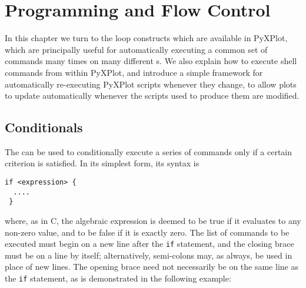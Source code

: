 %
%
%
%
%



\chapter{Programming and Flow Control}

In this chapter we turn to the loop constructs which are available in PyXPlot,
which are principally useful for automatically executing a common set of
commands many times on many different \datafile s. We also explain how to
execute shell commands from within PyXPlot, and introduce a simple framework
for automatically re-executing PyXPlot scripts whenever they change, to allow
plots to update automatically whenever the scripts used to produce them are
modified.

\section{Conditionals}

The  can be used to conditionally execute a series of commands only
if a certain criterion is satisfied. In its simplest form, its syntax is

\begin{verbatim}
if <expression> {
  ....
 }
\end{verbatim}

\noindent where, as in C, the algebraic expression is deemed to be true if it
evaluates to any non-zero value, and to be false if it is exactly zero. The
list of commands to be executed must begin on a new line after the {\tt if}
statement, and the closing brace must be on a line by itself; alternatively,
semi-colons may, as always, be used in place of new lines. The opening brace
need not necessarily be on the same line as the {\tt if} statement, as is
demonstrated in the following example:

